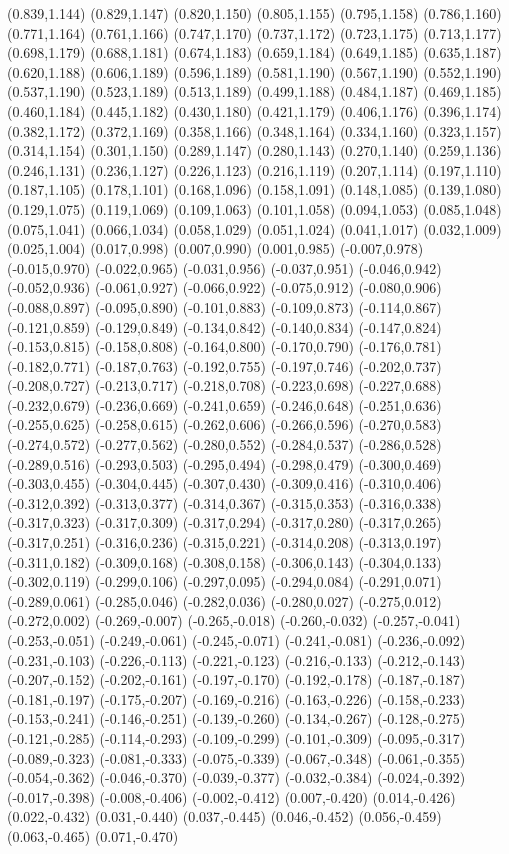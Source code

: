 (0.839,1.144) (0.829,1.147) (0.820,1.150) (0.805,1.155) (0.795,1.158) (0.786,1.160) (0.771,1.164) (0.761,1.166) (0.747,1.170) (0.737,1.172) (0.723,1.175) (0.713,1.177) (0.698,1.179) (0.688,1.181) (0.674,1.183) (0.659,1.184) (0.649,1.185) (0.635,1.187) (0.620,1.188) (0.606,1.189) (0.596,1.189) (0.581,1.190) (0.567,1.190) (0.552,1.190) (0.537,1.190) (0.523,1.189) (0.513,1.189) (0.499,1.188) (0.484,1.187) (0.469,1.185) (0.460,1.184) (0.445,1.182) (0.430,1.180) (0.421,1.179) (0.406,1.176) (0.396,1.174) (0.382,1.172) (0.372,1.169) (0.358,1.166) (0.348,1.164) (0.334,1.160) (0.323,1.157) (0.314,1.154) (0.301,1.150) (0.289,1.147) (0.280,1.143) (0.270,1.140) (0.259,1.136) (0.246,1.131) (0.236,1.127) (0.226,1.123) (0.216,1.119) (0.207,1.114) (0.197,1.110) (0.187,1.105) (0.178,1.101) (0.168,1.096) (0.158,1.091) (0.148,1.085) (0.139,1.080) (0.129,1.075) (0.119,1.069) (0.109,1.063) (0.101,1.058) (0.094,1.053) (0.085,1.048) (0.075,1.041) (0.066,1.034) (0.058,1.029) (0.051,1.024) (0.041,1.017) (0.032,1.009) (0.025,1.004) (0.017,0.998) (0.007,0.990) (0.001,0.985) (-0.007,0.978) (-0.015,0.970) (-0.022,0.965) (-0.031,0.956) (-0.037,0.951) (-0.046,0.942) (-0.052,0.936) (-0.061,0.927) (-0.066,0.922) (-0.075,0.912) (-0.080,0.906) (-0.088,0.897) (-0.095,0.890) (-0.101,0.883) (-0.109,0.873) (-0.114,0.867) (-0.121,0.859) (-0.129,0.849) (-0.134,0.842) (-0.140,0.834) (-0.147,0.824) (-0.153,0.815) (-0.158,0.808) (-0.164,0.800) (-0.170,0.790) (-0.176,0.781) (-0.182,0.771) (-0.187,0.763) (-0.192,0.755) (-0.197,0.746) (-0.202,0.737) (-0.208,0.727) (-0.213,0.717) (-0.218,0.708) (-0.223,0.698) (-0.227,0.688) (-0.232,0.679) (-0.236,0.669) (-0.241,0.659) (-0.246,0.648) (-0.251,0.636) (-0.255,0.625) (-0.258,0.615) (-0.262,0.606) (-0.266,0.596) (-0.270,0.583) (-0.274,0.572) (-0.277,0.562) (-0.280,0.552) (-0.284,0.537) (-0.286,0.528) (-0.289,0.516) (-0.293,0.503) (-0.295,0.494) (-0.298,0.479) (-0.300,0.469) (-0.303,0.455) (-0.304,0.445) (-0.307,0.430) (-0.309,0.416) (-0.310,0.406) (-0.312,0.392) (-0.313,0.377) (-0.314,0.367) (-0.315,0.353) (-0.316,0.338) (-0.317,0.323) (-0.317,0.309) (-0.317,0.294) (-0.317,0.280) (-0.317,0.265) (-0.317,0.251) (-0.316,0.236) (-0.315,0.221) (-0.314,0.208) (-0.313,0.197) (-0.311,0.182) (-0.309,0.168) (-0.308,0.158) (-0.306,0.143) (-0.304,0.133) (-0.302,0.119) (-0.299,0.106) (-0.297,0.095) (-0.294,0.084) (-0.291,0.071) (-0.289,0.061) (-0.285,0.046) (-0.282,0.036) (-0.280,0.027) (-0.275,0.012) (-0.272,0.002) (-0.269,-0.007) (-0.265,-0.018) (-0.260,-0.032) (-0.257,-0.041) (-0.253,-0.051) (-0.249,-0.061) (-0.245,-0.071) (-0.241,-0.081) (-0.236,-0.092) (-0.231,-0.103) (-0.226,-0.113) (-0.221,-0.123) (-0.216,-0.133) (-0.212,-0.143) (-0.207,-0.152) (-0.202,-0.161) (-0.197,-0.170) (-0.192,-0.178) (-0.187,-0.187) (-0.181,-0.197) (-0.175,-0.207) (-0.169,-0.216) (-0.163,-0.226) (-0.158,-0.233) (-0.153,-0.241) (-0.146,-0.251) (-0.139,-0.260) (-0.134,-0.267) (-0.128,-0.275) (-0.121,-0.285) (-0.114,-0.293) (-0.109,-0.299) (-0.101,-0.309) (-0.095,-0.317) (-0.089,-0.323) (-0.081,-0.333) (-0.075,-0.339) (-0.067,-0.348) (-0.061,-0.355) (-0.054,-0.362) (-0.046,-0.370) (-0.039,-0.377) (-0.032,-0.384) (-0.024,-0.392) (-0.017,-0.398) (-0.008,-0.406) (-0.002,-0.412) (0.007,-0.420) (0.014,-0.426) (0.022,-0.432) (0.031,-0.440) (0.037,-0.445) (0.046,-0.452) (0.056,-0.459) (0.063,-0.465) (0.071,-0.470) 